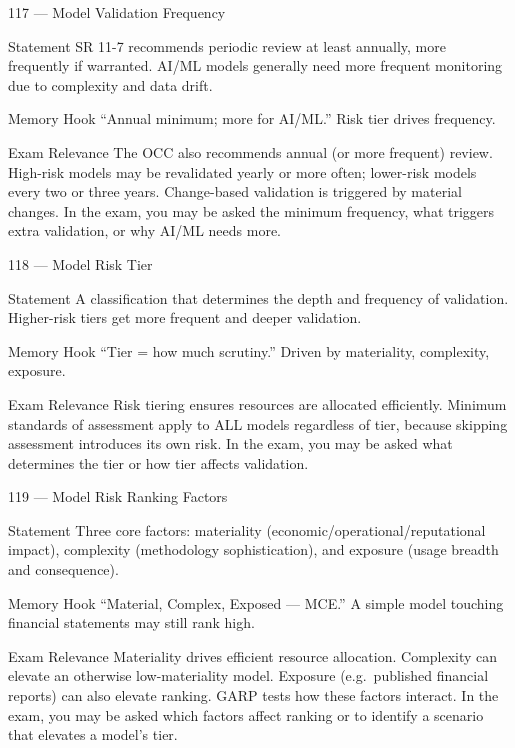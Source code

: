 \documentclass[aspectratio=169,8pt]{beamer}
\begin{document}
	\begin{frame}{117 --- Model Validation Frequency}
		\begin{block}{Statement}
			SR 11-7 recommends periodic review at least annually, more frequently if warranted. AI/ML models generally need more frequent monitoring due to complexity and data drift.
		\end{block}
		\begin{block}{Memory Hook}
			``Annual minimum; more for AI/ML.'' Risk tier drives frequency.
		\end{block}
		\begin{block}{Exam Relevance}
			The OCC also recommends annual (or more frequent) review. High-risk models may be revalidated yearly or more often; lower-risk models every two or three years. Change-based validation is triggered by material changes. In the exam, you may be asked the minimum frequency, what triggers extra validation, or why AI/ML needs more.
		\end{block}
	\end{frame}
	
	\begin{frame}{118 --- Model Risk Tier}
		\begin{block}{Statement}
			A classification that determines the depth and frequency of validation. Higher-risk tiers get more frequent and deeper validation.
		\end{block}
		\begin{block}{Memory Hook}
			``Tier = how much scrutiny.'' Driven by materiality, complexity, exposure.
		\end{block}
		\begin{block}{Exam Relevance}
			Risk tiering ensures resources are allocated efficiently. Minimum standards of assessment apply to ALL models regardless of tier, because skipping assessment introduces its own risk. In the exam, you may be asked what determines the tier or how tier affects validation.
		\end{block}
	\end{frame}
	
	\begin{frame}{119 --- Model Risk Ranking Factors}
		\begin{block}{Statement}
			Three core factors: materiality (economic/operational/reputational impact), complexity (methodology sophistication), and exposure (usage breadth and consequence).
		\end{block}
		\begin{block}{Memory Hook}
			``Material, Complex, Exposed --- MCE.'' A simple model touching financial statements may still rank high.
		\end{block}
		\begin{block}{Exam Relevance}
			Materiality drives efficient resource allocation. Complexity can elevate an otherwise low-materiality model. Exposure (e.g.\ published financial reports) can also elevate ranking. GARP tests how these factors interact. In the exam, you may be asked which factors affect ranking or to identify a scenario that elevates a model's tier.
		\end{block}
	\end{frame}
	
\end{document}
